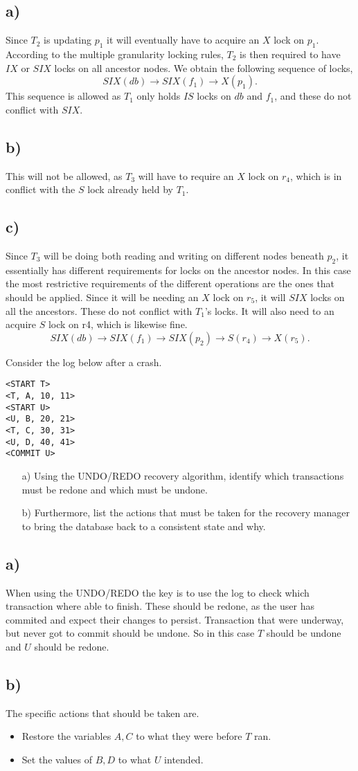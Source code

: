 \documentclass[working, oneside]{../../Preambles/tuftebook}
\begin{document}
\subsection*{a)}
Since $T_2$ is updating $p_1$ it will eventually have to acquire an $X$ lock on $p_1$. According to the multiple granularity locking rules, $T_2$ is then required to have $IX$ or $SIX$ locks on all ancestor nodes. We obtain the following sequence of locks,
\[
SIX\left( db \right) \to SIX\left( f_1 \right) \to X\left( p_1 \right) 
.\] 
This sequence is allowed as $T_1$ only holds $IS$ locks on $db$ and $f_1$, and these do not conflict with $SIX$.
\subsection*{b)}
This will not be allowed, as $T_3$ will have to require an $X$ lock on $r_4$, which is in conflict with the $S$ lock already held by $T_1$.
\subsection*{c)}
Since $T_3$ will be doing both reading and writing on different nodes beneath $p_2$, it essentially has different requirements for locks on the ancestor nodes. In this case the most restrictive requirements of the different operations are the ones that should be applied. Since it will be needing an $X$ lock on $r_5$, it will $SIX$ locks on all the ancestors. These do not conflict with $T_1$'s locks. It will also need to an acquire $S$ lock on r4, which is likewise fine.
\[
SIX\left( db \right) \to SIX\left( f_1 \right) \to SIX\left( p_2 \right) \to S\left( r_4 \right) \to X\left( r_5 \right) 
.\] 
\begin{exercise}[3]
Consider the log below after a crash.
\begin{verbatim}
<START T>
<T, A, 10, 11>
<START U>
<U, B, 20, 21>
<T, C, 30, 31>
<U, D, 40, 41>
<COMMIT U>
\end{verbatim}

\begin{enumerate}
    \item[a)] Using the UNDO/REDO recovery algorithm, identify which transactions must be redone and which must be undone.
    \item[b)] Furthermore, list the actions that must be taken for the recovery manager to bring the database back to a consistent state and why.
\end{enumerate}
\end{exercise}
\subsection*{a)}
When using the UNDO/REDO the key is to use the log to check which transaction where able to finish. These should be redone, as the user has commited and expect their changes to persist. Transaction that were underway, but never got to commit should be undone. So in this case $T$ should be undone and $U$ should be redone.
\subsection*{b)}
The specific actions that should be taken are.
\begin{itemize}
    \item Restore the variables $A, C$ to what they were before $T$ ran.
    \item Set the values of $B, D$ to what $U$ intended.
\end{itemize}
\end{document}
